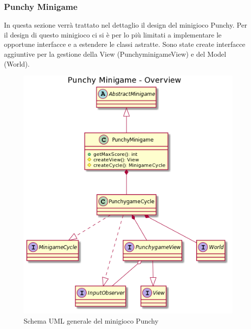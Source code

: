 \documentclass[a4paper,12pt]{report}
\begin{document}
	\subsubsection{Punchy Minigame}
	In questa sezione verrà trattato nel dettaglio il design del minigioco Punchy.\newline
	\newline
	Per il design di questo minigioco ci si è per lo più limitati a implementare le opportune interfacce e a estendere le classi astratte.
    Sono state create interfacce aggiuntive per la gestione della View (PunchyminigameView) e del Model (World).
    \begin{figure}[!t]
        \centering{}
        \includegraphics[width=150mm]{images/picchiotti/punchyoverview.png}
        \caption{Schema UML generale del minigioco Punchy}
        \label{img:punchyoverview}
    \end{figure}
\end{document}
